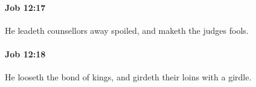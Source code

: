 		\paragraph{Job 12:17} %
			\label{JOB-12-17}

			He leadeth counsellors away spoiled, and maketh the judges fools.


		\paragraph{Job 12:18} %
			\label{JOB-12-18}

			He looseth the bond of kings, and girdeth their loins with a girdle.


